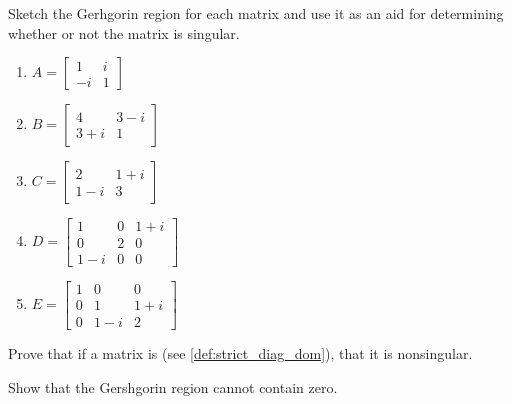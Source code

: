 \documentclass{ximera}
\begin{document}
\begin{problem}\label{prob:Gersh}
    Sketch the Gerhgorin region for each matrix and use it as an aid for determining whether or not the matrix is singular.

\begin{enumerate}
\item $A = \left[ \begin{array}{rr}
1 & i\\
-i & 1
\end{array}\right]$

\item $B = \left[ \begin{array}{cc}
4 & 3 - i \\
3 + i & 1
\end{array}\right]$

\item $C = \left[ \begin{array}{cc}
2 & 1 + i\\
1 - i & 3
\end{array}\right]$

\item $D = \left[ \begin{array}{ccc}
1 & 0 &  1 + i\\
0 & 2 & 0 \\
1 - i & 0 & 0
\end{array}\right]$

\item $E = \left[ \begin{array}{ccc}
1 & 0 & 0\\
0 & 1 & 1 + i\\
0 & 1 - i & 2
\end{array}\right]$
\end{enumerate}
\end{problem}

\begin{problem}\label{prob:prove_diag_dom_nonsingular}
    Prove that if a matrix is  (see \ref{def:strict_diag_dom}), that it is nonsingular.

    \begin{hint}
    Show that the Gershgorin region cannot contain zero.
    \end{hint}
\end{problem}
\end{document}
